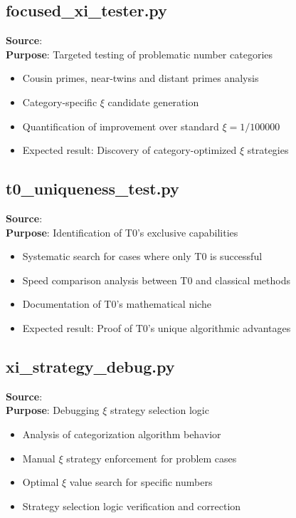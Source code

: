	\subsection{focused\_xi\_tester.py}
	\textbf{Source}: \\
	\textbf{Purpose}: Targeted testing of problematic number categories
	\begin{itemize}
		\item Cousin primes, near-twins and distant primes analysis
		\item Category-specific $\xi$ candidate generation
		\item Quantification of improvement over standard $\xi = 1/100000$
		\item Expected result: Discovery of category-optimized $\xi$ strategies
	\end{itemize}
	
	\subsection{t0\_uniqueness\_test.py}
	\textbf{Source}: \\
	\textbf{Purpose}: Identification of T0's exclusive capabilities
	\begin{itemize}
		\item Systematic search for cases where only T0 is successful
		\item Speed comparison analysis between T0 and classical methods
		\item Documentation of T0's mathematical niche
		\item Expected result: Proof of T0's unique algorithmic advantages
	\end{itemize}
	
	\subsection{xi\_strategy\_debug.py}
	\textbf{Source}: \\
	\textbf{Purpose}: Debugging $\xi$ strategy selection logic
	\begin{itemize}
		\item Analysis of categorization algorithm behavior
		\item Manual $\xi$ strategy enforcement for problem cases
		\item Optimal $\xi$ value search for specific numbers
		\item Strategy selection logic verification and correction
	\end{itemize}
	

